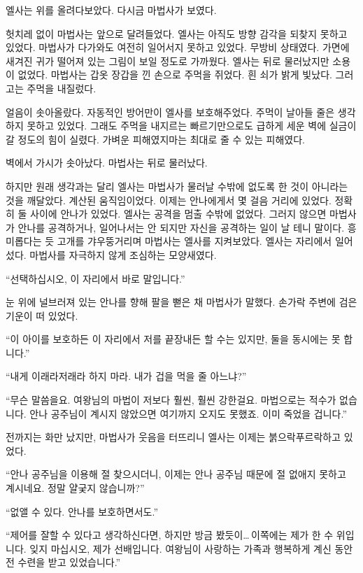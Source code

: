 엘사는 위를 올려다보았다. 다시금 마법사가 보였다.

헛치레 없이 마법사는 앞으로 달려들었다. 엘사는 아직도 방향 감각을 되찾지 못하고 있었다. 마법사가 다가와도 여전히 일어서지 못하고 있었다. 무방비 상태였다. 가면에 새겨진 귀가 떨어져 있는 그림이 보일 정도로 가까웠다. 엘사는 뒤로 물러났지만 소용이 없었다. 마법사는 갑옷 장갑을 낀 손으로 주먹을 쥐었다. 흰 쇠가 밝게 빛났다. 그러고는 주먹을 내질렀다.

얼음이 솟아올랐다. 자동적인 방어만이 엘사를 보호해주었다. 주먹이 날아들 줄은 생각하지 못하고 있었다. 그래도 주먹을 내지르는 빠르기만으로도 급하게 세운 벽에 실금이 갈 정도의 힘이 실렸다. 가벼운 피해였지마는 최대로 줄 수 있는 피해였다.

벽에서 가시가 솟아났다. 마법사는 뒤로 물러났다.

하지만 원래 생각과는 달리 엘사는 마법사가 물러날 수밖에 없도록 한 것이 아니라는 것을 깨달았다. 계산된 움직임이었다. 이제는 안나에게서 몇 걸음 거리에 있었다. 정확히 둘 사이에 안나가 있었다. 엘사는 공격을 멈출 수밖에 없었다. 그러지 않으면 마법사가 안나를 공격하거나, 일어나서는 안 되지만 자신을 공격하는 일이 날 테니 말이다. 흥미롭다는 듯 고개를 갸우뚱거리며 마법사는 엘사를 지켜보았다. 엘사는 자리에서 일어섰다. 마법사를 자극하지 않게 조심하는 모양새였다.

``선택하십시오, 이 자리에서 바로 말입니다.''

눈 위에 널브러져 있는 안나를 향해 팔을 뻗은 채 마법사가 말했다. 손가락 주변에 검은 기운이 떠 있었다.

``이 아이를 보호하든 이 자리에서 저를 끝장내든 할 수는 있지만, 둘을 동시에는 못 합니다.''

``내게 이래라저래라 하지 마라. 내가 겁을 먹을 줄 아느냐?''

``무슨 말씀을요. 여왕님의 마법이 저보다 훨씬, 훨씬 강한걸요. 마법으로는 적수가 없습니다. 안나 공주님이 계시지 않았으면 여기까지 오지도 못했죠. 이미 죽었을 겁니다.''

전까지는 화만 났지만, 마법사가 웃음을 터뜨리니 엘사는 이제는 붉으락푸르락하고 있었다.

``안나 공주님을 이용해 절 찾으시더니, 이제는 안나 공주님 때문에 절 없애지 못하고 계시네요. 정말 얄궂지 않습니까?''

``없앨 수 있다. 안나를 보호하면서도.''

``제어를 잘할 수 있다고 생각하신다면, 하지만 방금 봤듯이\ldots\,이쪽에는 제가 한 수 위입니다. 잊지 마십시오, 제가 선배입니다. 여왕님이 사랑하는 가족과 행복하게 계신 동안 전 수련을 받고 있었습니다.''

